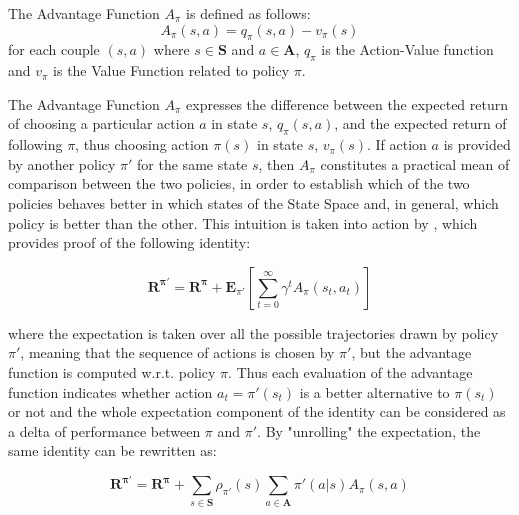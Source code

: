                 \begin{definition}
                    \label{def:advantagefunction}
                    The Advantage Function $A_{\pi}$ is defined as follows:
                    \[ A_{\pi}\left(s, a\right) = q_{\pi}\left(s, a\right) - v_{\pi}\left(s\right) \]
                    for each couple $(s, a)$ where $s \in \mathbf{S}$ and $a \in \mathbf{A}$, $q_{\pi}$ is the Action-Value function and $v_{\pi}$ is the Value Function related to policy $\pi$.
                \end{definition}
                \noindent
                The Advantage Function $A_{\pi}$ expresses the difference between the expected return of choosing a particular action $a$ in state $s$, $q_{\pi}(s, a)$, and the expected return of following $\pi$, thus choosing action $\pi(s)$ in state $s$, $v_{\pi}(s)$. If action $a$ is provided by another policy $\pi'$ for the same state $s$, then $A_{\pi}$ constitutes a practical mean of comparison between the two policies, in order to establish which of the two policies behaves better in which states of the State Space and, in general, which policy is better than the other. This intuition is taken into action by , which provides proof of the following identity:
                
                \[ \mathbf{R^{\pi'}} = \mathbf{R^{\pi}} + \mathbf{E}_{\pi'} \left[ \sum_{t=0}^\infty \gamma^t A_{\pi}\left(s_t, a_t\right) \right] \]
                
                where the expectation is taken over all the possible trajectories drawn by policy $\pi'$, meaning that the sequence of actions is chosen by $\pi'$, but the advantage function is computed w.r.t. policy $\pi$. Thus each evaluation of the advantage function indicates whether action $a_t = \pi'(s_t)$ is a better alternative to $\pi(s_t)$ or not and the whole expectation component of the identity can be considered as a delta of performance between $\pi$ and $\pi'$. By "unrolling" the expectation, the same identity can be rewritten as: 
                
                \[ \mathbf{R^{\pi'}} = \mathbf{R^{\pi}} + \sum_{s \in \mathbf{S}} \rho_{\pi'}(s) \sum_{a \in \mathbf{A}} \pi'(a|s) A_{\pi}(s,a) \]
            
